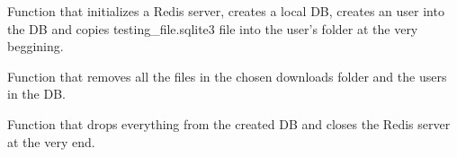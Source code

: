 \documentclass[letterpaper,10pt,english]{sphinxmanual}
\begin{document}
\begin{fulllineitems}
\begin{fulllineitems}
\end{fulllineitems}


\begin{fulllineitems}
\label{\detokenize{CE_app.tests:CE_app.tests.NihpoTestClass.setUpClass}}
\sphinxAtStartPar
Function that initializes a Redis server, creates a local DB, creates an user into the DB and 
copies testing\_file.sqlite3 file into the user’s folder at the very beggining.

\end{fulllineitems}


\begin{fulllineitems}
\label{\detokenize{CE_app.tests:CE_app.tests.NihpoTestClass.tearDown}}
\sphinxAtStartPar
Function that removes all the files in the chosen downloads folder and the users in the DB.

\end{fulllineitems}


\begin{fulllineitems}
\label{\detokenize{CE_app.tests:CE_app.tests.NihpoTestClass.tearDownClass}}
\sphinxAtStartPar
Function that drops everything from the created DB and closes the Redis server at the very end.

\end{fulllineitems}


\begin{fulllineitems}
\label{\detokenize{CE_app.tests:CE_app.tests.NihpoTestClass.username}}
\end{fulllineitems}


\end{fulllineitems}
\end{document}
